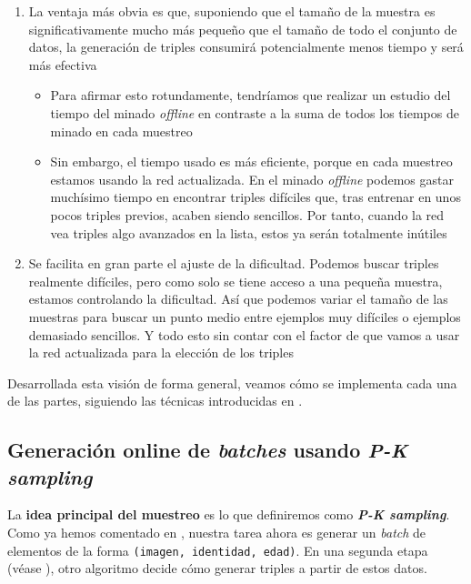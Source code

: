 \begin{enumerate}
    \item La ventaja más obvia es que, suponiendo que el tamaño de la muestra es significativamente mucho más pequeño que el tamaño de todo el conjunto de datos, la generación de triples consumirá potencialmente menos tiempo y será más efectiva
        \begin{itemize}
            \item Para afirmar esto rotundamente, tendríamos que realizar un estudio del tiempo del minado \textit{offline} en contraste a la suma de todos los tiempos de minado en cada muestreo
            \item Sin embargo, el tiempo usado es más eficiente, porque en cada muestreo estamos usando la red actualizada. En el minado \textit{offline} podemos gastar muchísimo tiempo en encontrar triples difíciles que, tras entrenar en unos pocos triples previos, acaben siendo sencillos. Por tanto, cuando la red vea triples algo avanzados en la lista, estos ya serán totalmente inútiles
        \end{itemize}
    \item Se facilita en gran parte el ajuste de la dificultad. Podemos buscar triples realmente difíciles, pero como solo se tiene acceso a una pequeña muestra, estamos controlando la dificultad. Así que podemos variar el tamaño de las muestras para buscar un punto medio entre ejemplos muy difíciles o ejemplos demasiado sencillos. Y todo esto sin contar con el factor de que vamos a usar la red actualizada para la elección de los triples
\end{enumerate}

Desarrollada esta visión de forma general, veamos cómo se implementa cada una de las partes, siguiendo las técnicas introducidas en \cite{informatica:principal}.

\subsection{Generación online de \textit{batches} usando \textit{P-K sampling}} \label{isubs:muestreo_datos_pk_sampling_teoria}

La \textbf{idea principal del muestreo} es lo que definiremos como \textbf{\textit{P-K sampling}}. Como ya hemos comentado en , nuestra tarea ahora es generar un \textit{batch} de elementos de la forma \lstinline{(imagen, identidad, edad)}. En una segunda etapa (véase ), otro algoritmo decide cómo generar triples a partir de estos datos.

